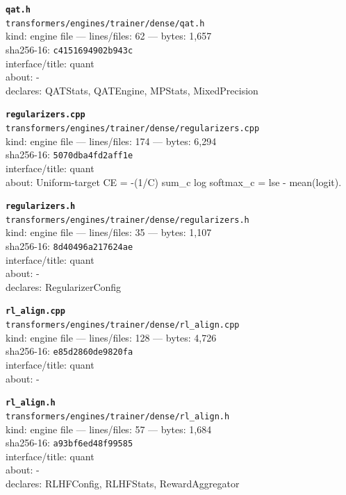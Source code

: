 \noindent\textbf{\texttt{qat.h}}\\
\texttt{transformers/engines/trainer/dense/qat.h}\\
kind: engine file --- lines/files: 62 --- bytes: 1,657\\
sha256-16: \texttt{c4151694902b943c}\\
interface/title: quant\\
about: -\\
declares: QATStats, QATEngine, MPStats, MixedPrecision\\
\vspace*{6.0pt}

\noindent\textbf{\texttt{regularizers.cpp}}\\
\texttt{transformers/engines/trainer/dense/regularizers.cpp}\\
kind: engine file --- lines/files: 174 --- bytes: 6,294\\
sha256-16: \texttt{5070dba4fd2aff1e}\\
interface/title: quant\\
about: Uniform-target CE = -(1/C) sum\_c log softmax\_c = lse - mean(logit).\\
\vspace*{6.0pt}

\noindent\textbf{\texttt{regularizers.h}}\\
\texttt{transformers/engines/trainer/dense/regularizers.h}\\
kind: engine file --- lines/files: 35 --- bytes: 1,107\\
sha256-16: \texttt{8d40496a217624ae}\\
interface/title: quant\\
about: -\\
declares: RegularizerConfig\\
\vspace*{6.0pt}
\newpage

\noindent\textbf{\texttt{rl\_align.cpp}}\\
\texttt{transformers/engines/trainer/dense/rl\_align.cpp}\\
kind: engine file --- lines/files: 128 --- bytes: 4,726\\
sha256-16: \texttt{e85d2860de9820fa}\\
interface/title: quant\\
about: -\\
\vspace*{6.0pt}

\noindent\textbf{\texttt{rl\_align.h}}\\
\texttt{transformers/engines/trainer/dense/rl\_align.h}\\
kind: engine file --- lines/files: 57 --- bytes: 1,684\\
sha256-16: \texttt{a93bf6ed48f99585}\\
interface/title: quant\\
about: -\\
declares: RLHFConfig, RLHFStats, RewardAggregator\\
\vspace*{6.0pt}

